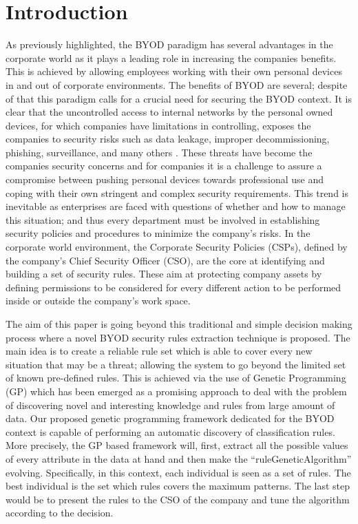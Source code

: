 \documentclass[runningheads,a4paper]{llncs}
\begin{document}
\section{Introduction}
\label{sec:intro}


As previously highlighted, the BYOD paradigm has several advantages in
the corporate world as it plays a leading role in increasing the
companies benefits. This is achieved by allowing employees working
with their own personal devices in and out of corporate
environments. The benefits of BYOD are several; despite of that this
paradigm calls for a crucial need for securing the BYOD context. It is
clear that the uncontrolled access to internal networks by the
personal owned devices, for which companies have limitations in
controlling, exposes the companies to security risks such as data
leakage, improper decommissioning, phishing, surveillance, and many
others \cite{lennon2012changing}. These threats have become the
companies security concerns and for companies it is a challenge to
assure a compromise between pushing personal devices towards
professional use and coping with their own stringent and complex
security requirements. This trend is inevitable as enterprises are
faced with questions of whether and how to manage this situation; and
thus every department must be involved in establishing security
policies and procedures to minimize the company's risks. In the
corporate world environment, the Corporate Security Policies (CSPs),
defined by the company's Chief Security Officer (CSO), are the core at
identifying and building a set of security rules. These aim at protecting
company assets by defining permissions to be considered for every
different action to be performed inside or outside the company's work
space. %

The aim of this paper is going beyond this traditional and simple
decision making process where a novel  BYOD security rules extraction
technique is proposed. The main idea is to create a reliable rule set
which is able to cover every new situation that may be a threat;
allowing the system to go beyond the limited set of known pre-defined
rules. This is achieved via the use of Genetic Programming (GP) which
has been emerged as a promising approach to deal with the problem of
discovering novel and interesting knowledge and rules from large
amount of data. Our proposed genetic programming framework dedicated
for the BYOD context is capable of performing an automatic discovery
of classification rules. More precisely, the GP based framework will,
first, extract all the possible values of every attribute in the data
at hand and then make the ``ruleGeneticAlgorithm''
evolving. Specifically, in this context, each individual is seen as a
set of rules. The best individual is the set which rules covers the
maximum patterns. The last step would be to present the rules to the
CSO of the company and tune the algorithm according to the decision. 
\end{document}
